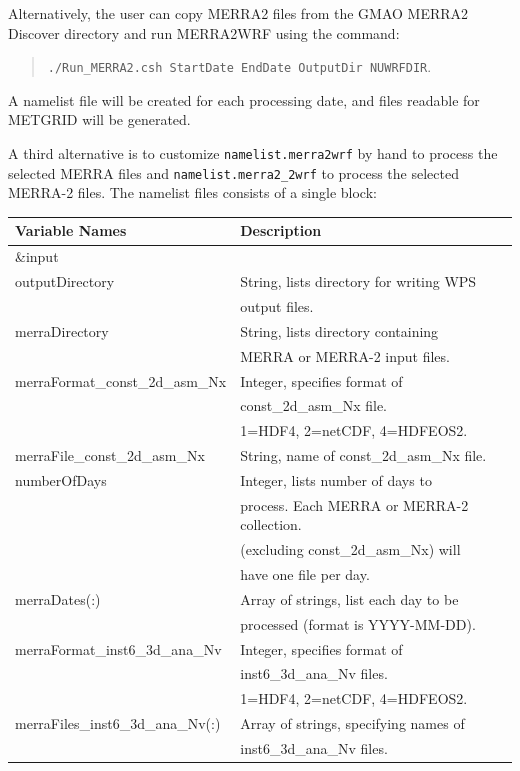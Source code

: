 Alternatively, the user can copy MERRA2 files from the GMAO MERRA2 Discover 
directory and run MERRA2WRF using the command:
\begin{quote}
  \texttt{./Run\_MERRA2.csh StartDate EndDate OutputDir NUWRFDIR}.
\end{quote} 
A namelist file will be created for each processing date, and files readable 
for METGRID will be generated.  

A third alternative is to customize \texttt{namelist.merra2wrf} by hand to 
process the selected MERRA files and \texttt{namelist.merra2\_2wrf} to process
the selected MERRA-2 files. The namelist files consists of a single block:

\begin{tabular}{|l|l|} \hline
Variable Names & Description \\ \hline
\&input          & \\ \hline
outputDirectory  & String, lists directory for writing WPS \\
                 & output files. \\ \hline
merraDirectory   & String, lists directory containing \\
                 & MERRA or MERRA-2 input files. \\ \hline
merraFormat\_const\_2d\_asm\_Nx & Integer, specifies format of\\
 &  const\_2d\_asm\_Nx file. \\ 
 &  1=HDF4, 2=netCDF, 4=HDFEOS2. \\ \hline
merraFile\_const\_2d\_asm\_Nx & String, name of const\_2d\_asm\_Nx file. \\ \hline
numberOfDays & Integer, lists number of days to \\
& process. Each MERRA or MERRA-2 collection. \\
& (excluding const\_2d\_asm\_Nx) will \\
& have one file per day. \\ \hline
merraDates(:) & Array of strings, list each day to be\\
 &  processed (format is YYYY-MM-DD). \\ \hline
merraFormat\_inst6\_3d\_ana\_Nv & Integer, specifies format of\\
 & inst6\_3d\_ana\_Nv files.\\
 &  1=HDF4, 2=netCDF, 4=HDFEOS2. \\ \hline
merraFiles\_inst6\_3d\_ana\_Nv(:) & Array of strings, specifying names of \\
 & inst6\_3d\_ana\_Nv files. \\ \hline

\end{tabular}
